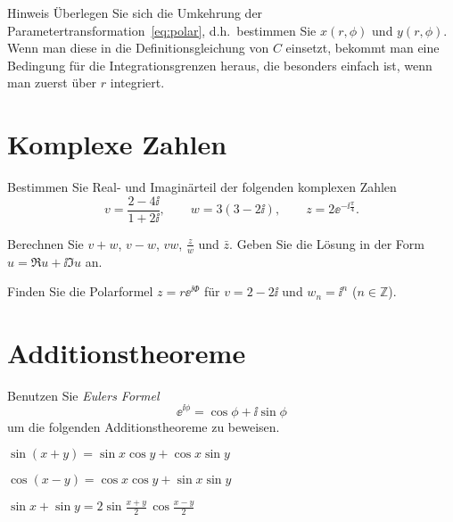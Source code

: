 \documentclass{scrartcl}
\begin{document}
\begin{remark}{Hinweis}
  Überlegen Sie sich die Umkehrung der Parametertransformation~\eqref{eq:polar}, d.h.\ bestimmen Sie $x(r,\phi)$ und $y(r,\phi)$.
  Wenn man diese in die Definitionsgleichung von $C$ einsetzt, bekommt man eine Bedingung für die Integrationsgrenzen heraus, die besonders einfach ist, wenn man zuerst über $r$ integriert.
\end{remark}


\section{Komplexe Zahlen }
\label{sec:komplexe_zahlen}

\begin{subex}
  \item{} Bestimmen Sie Real- und Imaginärteil der folgenden komplexen Zahlen
  \[
    v = \frac{2 - 4\ii}{1 + 2\ii}, \quad\quad w = 3(3 - 2\ii), \quad\quad z = 2 \ee^{-\ii \frac{\pi}{4}}.
  \]
  \item{} Berechnen Sie $v + w$, $v - w$, $vw$, $\frac{z}{w}$ und $\bar z$.
  Geben Sie die Lösung in der Form $u = \Re u + \ii\Im u$ an.
  \item{} Finden Sie die Polarformel $z = r \ee^{\ii\Phi}$ für $v = 2 - 2\ii$ und $w_n = \ii^n$ ($n \in \mathbb{Z}$).
\end{subex}


\section{Additionstheoreme }
\label{sec:additionstheoreme}

Benutzen Sie \emph{Eulers Formel}
\[
  \ee^{\ii \phi} = \cos \phi + \ii \sin \phi
\]
um die folgenden Additionstheoreme zu beweisen.

\begin{subex}
  \item{} $\sin(x + y) = \sin x \cos y + \cos x \sin y$
  \item{} $\cos(x - y) = \cos x \cos y + \sin x \sin y$
  \item{} $\sin x + \sin y = 2 \sin \frac{x + y}{2} \, \cos \frac{x - y}{2}$
\end{subex}
\end{document}
